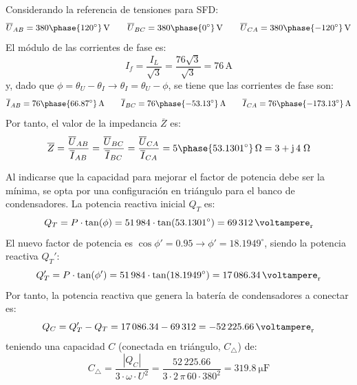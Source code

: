 Considerando la referencia de tensiones para SFD:
\begin{equation*}
    \overline{U}_{AB}=380\phase{120^\circ}\,\si{\volt}\qquad 
    \overline{U}_{BC}=380\phase{0^\circ}\,\si{\volt}\qquad 
    \overline{U}_{CA}=380\phase{-120^\circ}\,\si{\volt}
\end{equation*}
El módulo de las corrientes de fase es:
\begin{equation*}
    I_f=\dfrac{I_L}{\sqrt{3}}=\dfrac{76\sqrt{3}}{\sqrt{3}}=76\,\si{\ampere}
\end{equation*}
y, dado que $\phi=\theta_U-\theta_I\rightarrow \theta_I=\theta_U-\phi$, se tiene que las corrientes de fase son: 
\begin{equation*}
    \overline{I}_{AB}=76\phase{66.87^\circ}\,\si{\ampere}\qquad 
    \overline{I}_{BC}=76\phase{-53.13^\circ}\,\si{\ampere}\qquad 
    \overline{I}_{CA}=76\phase{-173.13^\circ}\,\si{\ampere}
\end{equation*}
Por tanto, el valor de la impedancia $\overline{Z}$ es: 
\begin{equation*}
    \overline{Z}=\dfrac{\overline{U}_{AB}}{\overline{I}_{AB}}=\dfrac{\overline{U}_{BC}}{\overline{I}_{BC}}=\dfrac{\overline{U}_{CA}}{\overline{I}_{CA}}=5\phase{53.1301^\circ}\,\Omega={3+\mathrm{j}\,4}\;\Omega
\end{equation*}

Al indicarse que la capacidad para mejorar el factor de potencia debe ser la {mínima}, se opta por una configuración en {triángulo} para el banco de condensadores. La potencia reactiva inicial $Q_T$ es:
\begin{equation*}
    Q_T=P\cdot \tan(\phi)=51\,984\cdot \tan(53.1301^\circ)=\qty{69312}{\voltampere_r}
\end{equation*}
El nuevo factor de potencia es $\cos{\phi'}=0.95\rightarrow\phi'=18.1949^\circ$, siendo la potencia reactiva $Q_T'$:
\begin{equation*}
    Q_T'=P\cdot \tan(\phi')=51\,984\cdot \tan(18.1949^\circ)=\qty{17086.34}{\voltampere_r}
\end{equation*}
Por tanto, la potencia reactiva que genera la batería de condensadores a conectar es: 
\begin{equation*}
    Q_C=Q_T'-Q_T=17\,086.34-69\,312=\qty{-52225.66}{\voltampere_r}
\end{equation*}
teniendo una capacidad $C$ (conectada en triángulo, $C_{\triangle}$) de:
\begin{equation*}
    C_{\triangle}=\dfrac{|Q_C|}{3\cdot\omega\cdot U^2}=\dfrac{52\,225.66}{3\cdot 2\,\pi\, 60\cdot 380^2}= \qty{319.8}{\micro\farad}
\end{equation*}



